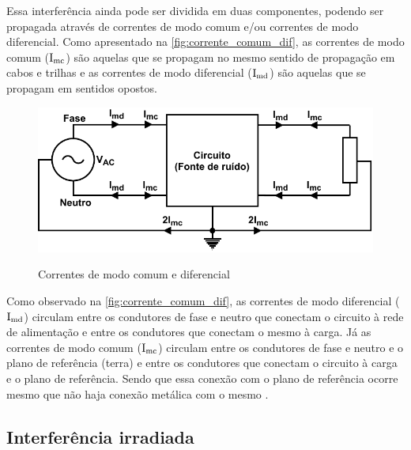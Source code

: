         Essa interferência ainda pode ser dividida em duas componentes, podendo ser propagada através de correntes de modo comum e/ou correntes de modo diferencial.
        Como apresentado na \autoref{fig:corrente_comum_dif}, as correntes de modo comum ($\text{I}_\text{mc}$) são aquelas que se propagam no mesmo sentido de propagação em cabos e trilhas e as correntes de modo diferencial ($\text{I}_\text{md}$) são aquelas que se propagam em sentidos opostos. 
        
        \begin{figure}[H]
        	\centering
        	\caption{Correntes de modo comum e diferencial}
        	\includegraphics[scale=1]{pdf/outros/gerador_ruido.pdf}
        	\label{fig:corrente_comum_dif}
        \end{figure}
        
        Como observado na \autoref{fig:corrente_comum_dif}, as correntes de modo diferencial ($\text{I}_\text{md}$) circulam entre os condutores de fase e neutro que conectam o circuito à rede de alimentação e entre os condutores que conectam o mesmo à carga. Já as correntes de modo comum ($\text{I}_\text{mc}$) circulam entre os condutores de fase e neutro e o plano de referência (terra) e entre os condutores que conectam o circuito à carga e o plano de referência. Sendo que essa conexão com o plano de referência ocorre mesmo que não haja conexão metálica com o mesmo \cite{ref:EMC_phd_schlichting}. 
        
        \subsection{Interferência irradiada} \label{cap:fund_emc_intirrad}
        
